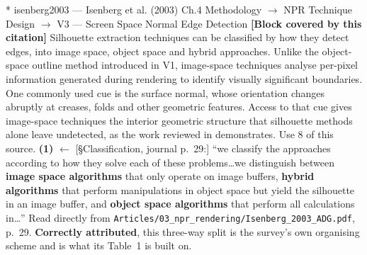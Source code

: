 \documentclass[11pt, a4paper]{article}
\makeatletter
\newcounter{citentry}
\newcommand{\citentry@core}[7]{%
  \stepcounter{citentry}
  \begingroup
  \sbox{\citentry@measurebox}{%
    \begin{minipage}{\linewidth}
      \noindent\colorbox{konstanzblue}{\parbox{\dimexpr\linewidth-2\fboxsep}{%
        \vspace{3pt}
        \textbf{\#\thecitentry \quad #2} \hfill \textit{#3}
        \vspace{3pt}
      }}
      \vspace{3pt}
      \noindent\begin{tabular}{@{}p{2.7cm} p{\dimexpr\linewidth-3cm}@{}}
        \textit{\small Sentence in thesis:} & #4 \\[5pt]
        \textbf{Usage:}\hfill       & #5 \\[5pt]
        \textit{\small Original source:}     & #6 \\[5pt]
        \textbf{How to check:}             & #7 \\
      \end{tabular}
      \vspace{5pt}
      \rule{10pt}{10pt}\quad \textbf{Validated} --- I have read the original and agree it supports the sentence.
    \end{minipage}%
  }%
  \Needspace{\dimexpr\ht\citentry@measurebox+\dp\citentry@measurebox\relax}%
  \endgroup
  \vspace{10pt}
  \noindent\colorbox{konstanzblue}{\parbox{\dimexpr\linewidth-2\fboxsep}{%
    \vspace{3pt}
    \textcolor{white}{\textbf{\#\thecitentry \quad #2}} \hfill \textcolor{white}{\textit{#3}}
    \vspace{3pt}
  }}
  \vspace{3pt}
  \noindent\begin{tabular}{@{}p{2.7cm} p{\dimexpr\linewidth-3cm}@{}}
    \textit{\small Sentence in thesis:} & \textcolor{darkgreen}{#4} \\[5pt]
    \textbf{Usage:}\hfill       & #5 \\[5pt]
    \textit{\small Original source:}     & \textcolor{darkred}{#6} \\[5pt]
    \textbf{How to check:}             & #7 \\
  \end{tabular}
  \vspace{5pt}
  \noindent\CheckBox[name=verified\thecitentry, width=10pt, height=10pt, bordercolor={0 0 0}, borderwidth=0.75, backgroundcolor={1 1 1}#1]{}\quad \textbf{Validated} --- I have read the original and agree it supports the sentence.
  \vspace{3pt}
  \noindent\textcolor{midgray}{\rule{\linewidth}{0.4pt}}
}
\newcommand{\citentry}{\@ifstar{\citentry@core{, checked}}{\citentry@core{}}}
\makeatother
\begin{document}
\begin{Form}
\citentry*
  {isenberg2003 --- Isenberg et al. (2003)}
  {Ch.4 Methodology $\rightarrow$ NPR Technique Design $\rightarrow$ V3 — Screen Space Normal Edge Detection}
  {\textbf{[Block covered by this citation]} Silhouette extraction techniques can be classified by how they detect edges, into image space, object space and hybrid approaches. Unlike the object-space outline method introduced in V1, image-space techniques analyse per-pixel information generated during rendering to identify visually significant boundaries. One commonly used cue is the surface normal, whose orientation changes abruptly at creases, folds and other geometric features. Access to that cue gives image-space techniques the interior geometric structure that silhouette methods alone leave undetected, as the work reviewed in demonstrates.}
  {Use 8 of this source.}
  {\textbf{(1)} $\leftarrow$ [\S Classification, journal p.~29:] ``we classify the approaches according to how they solve each of these problems\ldots we distinguish between \textbf{image space algorithms} that only operate on image buffers, \textbf{hybrid algorithms} that perform manipulations in object space but yield the silhouette in an image buffer, and \textbf{object space algorithms} that perform all calculations in\ldots''}
  {Read directly from \texttt{\footnotesize Articles/03\_npr\_rendering/Isenberg\_2003\_ADG.pdf}, p.~29. \textbf{Correctly attributed}, this three-way split is the survey's own organising scheme and is what its Table~1 is built on.}


\end{Form}
\end{document}
